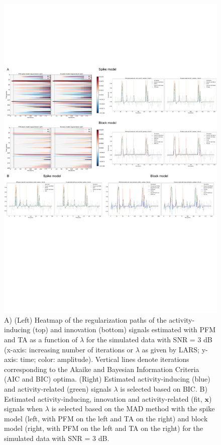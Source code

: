 \begin{figure}[H]
    \begin{center}
        \includegraphics[width=\textwidth]{figures/figure_sim.pdf}
    \end{center}
    \caption{A) (Left) Heatmap of the regularization paths of the activity-inducing (top) and innovation (bottom) signals estimated with PFM and TA as a function of $\lambda$ for the simulated data with SNR = 3 dB (x-axis: increasing number of iterations or $\lambda$ as given by LARS; y-axis: time; color: amplitude). Vertical lines denote iterations corresponding to the Akaike and Bayesian Information Criteria (AIC and BIC) optima. (Right) Estimated activity-inducing (blue) and activity-related (green) signals $\lambda$ is selected based on BIC. B) Estimated activity-inducing, innovation and activity-related (fit, $\mathbf{x}$) signals when $\lambda$ is selected based on the MAD method with the spike model (left, with PFM on the left and TA on the right) and block model (right, with PFM on the left and TA on the right) for the simulated data with SNR = 3 dB.}
\label{fig:sim}
\end{figure}

